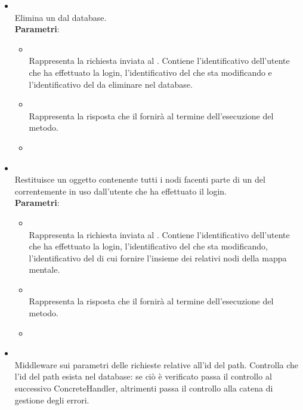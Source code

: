 \begin{itemize}
\begin{itemize}
\item {}
\\ Elimina un  dal database.
\\ \textbf{Parametri}:
\begin{itemize}
\item {}
\\ Rappresenta la richiesta inviata al . Contiene l’identificativo dell’utente che ha effettuato la login, l’identificativo del  che sta modificando e l’identificativo del  da eliminare nel database.
\item {}
\\ Rappresenta la risposta che il  fornirà al termine dell’esecuzione del metodo.
\item {}
\\ \dpNext
\end{itemize}
\item {}
\\ Restituisce un oggetto  contenente tutti i nodi facenti parte di un  del  correntemente in uso dall’utente che ha effettuato il login.
\\ \textbf{Parametri}:
\begin{itemize}
\item {}
\\ Rappresenta la richiesta inviata al . Contiene l’identificativo dell’utente che ha effettuato la login, l’identificativo del  che sta modificando,  l’identificativo del  di cui fornire l’insieme dei relativi nodi della mappa mentale.
\item {}
\\ Rappresenta la risposta che il  fornirà al termine dell’esecuzione del metodo.
\item {}
\\ \dpNext
\end{itemize}
\item {}
\\ Middleware sui parametri delle richieste  relative all'id del path. Controlla che l'id del path esista nel database: se ciò è verificato passa il controllo al successivo ConcreteHandler, altrimenti passa il controllo alla catena di gestione degli errori.

\end{itemize}
\end{itemize}
